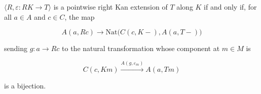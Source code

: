 $\langle R, \varepsilon: RK \to T \rangle$ is a pointwise right Kan extension of $T$ along $K$ if and only if, for all $a \in A$ and $c \in C$, the map

$$A(a, Rc) \to \mathrm{Nat}\bigl(C(c, K-), A(a, T-)\bigr)$$

sending $g: a \to Rc$ to the natural transformation whose component at $m \in M$ is

$$C(c, Km) \xrightarrow{A(g, \varepsilon_m)} A(a, Tm)$$

is a bijection.
